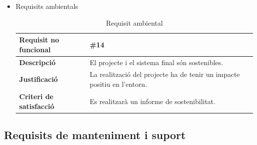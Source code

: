 \begin{itemize}
\item{Requisits ambientals}

\begin{table}[!h]
\centering
\begin{tabular}{|l|M|}
\hline
\textbf{Requisit no funcional }& \#14   \\ \hline
\textbf{Descripció} & El projecte i el sistema final són sostenibles. \\ \hline
\textbf{Justificació} & La realització del projecte ha de tenir un impacte positiu en l’entorn. \\ \hline
\textbf{Criteri de satisfacció} & Es realitzarà un informe de sostenibilitat.\\ \hline
\end{tabular}
\label{}
\caption{Requisit ambiental}
\end{table}

\end{itemize}

\clearpage

\subsection{Requisits de manteniment i suport}


